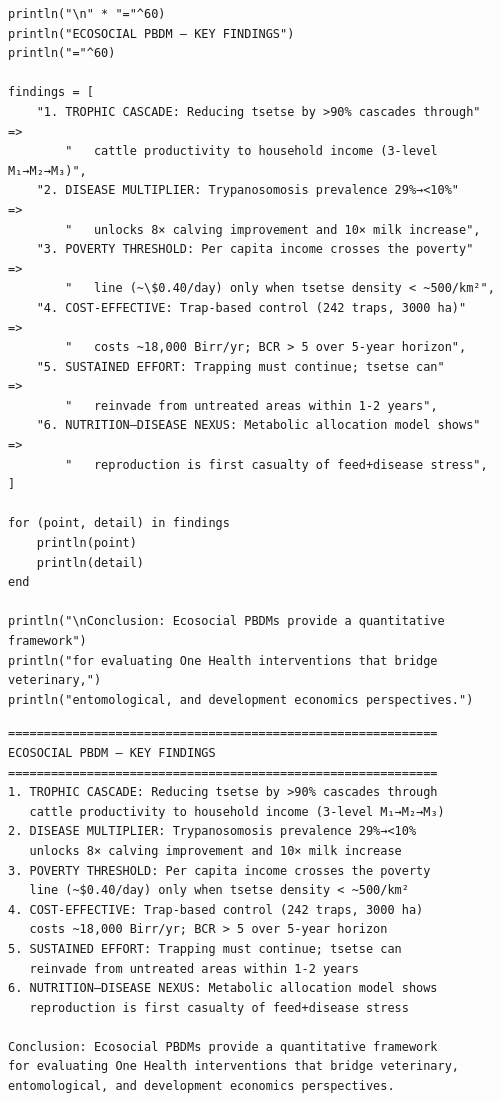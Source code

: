 \begin{verbatim}
println("\n" * "="^60)
println("ECOSOCIAL PBDM — KEY FINDINGS")
println("="^60)

findings = [
    "1. TROPHIC CASCADE: Reducing tsetse by >90% cascades through"         =>
        "   cattle productivity to household income (3-level M₁→M₂→M₃)",
    "2. DISEASE MULTIPLIER: Trypanosomosis prevalence 29%→<10%"            =>
        "   unlocks 8× calving improvement and 10× milk increase",
    "3. POVERTY THRESHOLD: Per capita income crosses the poverty"           =>
        "   line (~\$0.40/day) only when tsetse density < ~500/km²",
    "4. COST-EFFECTIVE: Trap-based control (242 traps, 3000 ha)"           =>
        "   costs ~18,000 Birr/yr; BCR > 5 over 5-year horizon",
    "5. SUSTAINED EFFORT: Trapping must continue; tsetse can"              =>
        "   reinvade from untreated areas within 1-2 years",
    "6. NUTRITION–DISEASE NEXUS: Metabolic allocation model shows"         =>
        "   reproduction is first casualty of feed+disease stress",
]

for (point, detail) in findings
    println(point)
    println(detail)
end

println("\nConclusion: Ecosocial PBDMs provide a quantitative framework")
println("for evaluating One Health interventions that bridge veterinary,")
println("entomological, and development economics perspectives.")
\end{verbatim}




\begin{verbatim}
============================================================
ECOSOCIAL PBDM — KEY FINDINGS
============================================================
1. TROPHIC CASCADE: Reducing tsetse by >90% cascades through
   cattle productivity to household income (3-level M₁→M₂→M₃)
2. DISEASE MULTIPLIER: Trypanosomosis prevalence 29%→<10%
   unlocks 8× calving improvement and 10× milk increase
3. POVERTY THRESHOLD: Per capita income crosses the poverty
   line (~$0.40/day) only when tsetse density < ~500/km²
4. COST-EFFECTIVE: Trap-based control (242 traps, 3000 ha)
   costs ~18,000 Birr/yr; BCR > 5 over 5-year horizon
5. SUSTAINED EFFORT: Trapping must continue; tsetse can
   reinvade from untreated areas within 1-2 years
6. NUTRITION–DISEASE NEXUS: Metabolic allocation model shows
   reproduction is first casualty of feed+disease stress

Conclusion: Ecosocial PBDMs provide a quantitative framework
for evaluating One Health interventions that bridge veterinary,
entomological, and development economics perspectives.
\end{verbatim}



